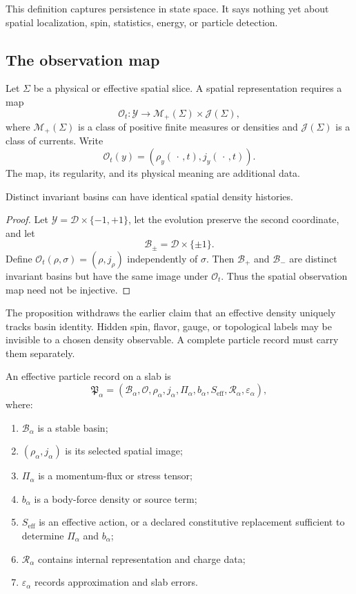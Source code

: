 \documentclass[11pt]{article}
\newcommand{\cY}{\mathcal{Y}}
\newcommand{\cB}{\mathcal{B}}
\newcommand{\cO}{\mathcal{O}}
\begin{document}
This definition captures persistence in state space.  It says nothing yet
about spatial localization, spin, statistics, energy, or particle detection.

\subsection{The observation map}

Let $\Sigma$ be a physical or effective spatial slice.  A spatial
representation requires a map
\[
 \cO_t:\cY\longrightarrow \mathcal{M}_+(\Sigma)\times\mathcal{J}(\Sigma),
\]
where $\mathcal{M}_+(\Sigma)$ is a class of positive finite measures or
densities and $\mathcal{J}(\Sigma)$ is a class of currents.  Write
\[
 \cO_t(y)=(\rho_y(\,\cdot\,,t),j_y(\,\cdot\,,t)).
\]
The map, its regularity, and its physical meaning are additional data.

\begin{proposition}
\label{prop:noninjective}
Distinct invariant basins can have identical spatial density histories.
\end{proposition}

\begin{proof}
Let $\cY=\mathcal{D}\times\{-1,+1\}$, let the evolution preserve the second
coordinate, and let
\[
 \cB_\pm=\mathcal{D}\times\{\pm1\}.
\]
Define $\cO_t(\rho,\sigma)=(\rho,j_\rho)$ independently of $\sigma$.  Then
$\cB_+$ and $\cB_-$ are distinct invariant basins but have the same image
under $\cO_t$.  Thus the spatial observation map need not be injective.
\end{proof}

The proposition withdraws the earlier claim that an effective density
uniquely tracks basin identity.  Hidden spin, flavor, gauge, or topological
labels may be invisible to a chosen density observable.  A complete particle
record must carry them separately.

\begin{definition}\label{def:particle-record}
An effective particle record on a slab is
\[
 \mathfrak{P}_\alpha
 =
 (\cB_\alpha,\cO,\rho_\alpha,j_\alpha,
  \Pi_\alpha,b_\alpha,S_{\mathrm{eff}},
  \mathcal{R}_\alpha,\varepsilon_\alpha),
\]
where:
\begin{enumerate}
\item $\cB_\alpha$ is a stable basin;
\item $(\rho_\alpha,j_\alpha)$ is its selected spatial image;
\item $\Pi_\alpha$ is a momentum-flux or stress tensor;
\item $b_\alpha$ is a body-force density or source term;
\item $S_{\mathrm{eff}}$ is an effective action, or a declared constitutive
replacement sufficient to determine $\Pi_\alpha$ and $b_\alpha$;
\item $\mathcal{R}_\alpha$ contains internal representation and charge data;
\item $\varepsilon_\alpha$ records approximation and slab errors.
\end{enumerate}
\end{definition}
\end{document}
